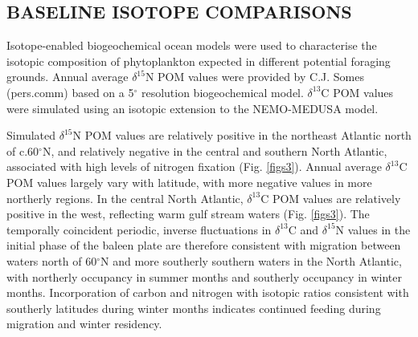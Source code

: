 \documentclass[a4paper,12pt]{article}
\begin{document}
\subsection*{BASELINE ISOTOPE COMPARISONS}
Isotope-enabled biogeochemical ocean models\cite{magozzi2017using,schmittner2016complementary} were used to characterise the isotopic composition of phytoplankton expected in different potential foraging grounds. 
Annual average $\delta^{15}$N POM values were provided by C.J. Somes (pers.comm) based on a 5$^{\circ}$ resolution biogeochemical model. 
$\delta^{13}$C POM values were simulated using an isotopic extension to the NEMO-MEDUSA model\cite{magozzi2017using}.
 
Simulated $\delta^{15}$N POM values are relatively positive in the northeast Atlantic north of c.60$^{\circ}$N, and relatively negative in the central and southern North Atlantic, associated with high levels of nitrogen fixation (Fig. \ref{figs3}). 
Annual average $\delta^{13}$C POM values largely vary with latitude, with more negative values in more northerly regions. 
In the central North Atlantic, $\delta^{13}$C POM values are relatively positive in the west, reflecting warm gulf stream waters (Fig. \ref{figs3}). 
The temporally coincident periodic, inverse fluctuations in $\delta^{13}$C and $\delta^{15}$N values in the initial phase of the baleen plate are therefore consistent with migration between waters north of 60$^{\circ}$N and more southerly southern waters in the North Atlantic, with northerly occupancy in summer months and southerly occupancy in winter months. 
Incorporation of carbon and nitrogen with isotopic ratios consistent with southerly latitudes during winter months indicates continued feeding during migration and winter residency.
 
\end{document}

